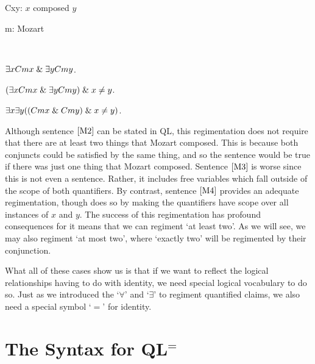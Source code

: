 \begin{multicols}{2}

\begin{ekey}
  \item[Cxy:] $x$ composed $y$
  \item[m:] Mozart
  \item[] ~
\end{ekey}

\begin{earg}
  \item[\ex{M2}] $\exists x Cmx \mathrel\& \exists y Cmy$.
  \item[\ex{M3}] $(\exists x Cmx \mathrel\& \exists y Cmy) \mathrel\& x\neq y$.
  \item[\ex{M4}] $\exists x\exists y((Cmx \mathrel\& Cmy) \mathrel\& x\neq y)$.
\end{earg}

\end{multicols}

Although sentence $\ref{M2}$ can be stated in QL, this regimentation does not require that there are at least two things that Mozart composed.
This is because both conjuncts could be satisfied by the same thing, and so the sentence would be true if there was just one thing that Mozart composed.
Sentence $\ref{M3}$ is worse since this is not even a sentence. 
Rather, it includes free variables which fall outside of the scope of both quantifiers.
By contrast, sentence $\ref{M4}$ provides an adequate regimentation, though does so by making the quantifiers have scope over all instances of $x$ and $y$. 
The success of this regimentation has profound consequences for it means that we can regiment `at least two'.
As we will see, we may also regiment `at most two', where `exactly two' will be regimented by their conjunction.

What all of these cases show us is that if we want to reflect the logical relationships having to do with identity, we need special logical vocabulary to do so.
Just as we introduced the `$\forall$' and `$\exists$' to regiment quantified claims, we also need a special symbol `$=$' for identity.




\section{The Syntax for QL$^=$}
  \label{sec:SyntaxQL=}

